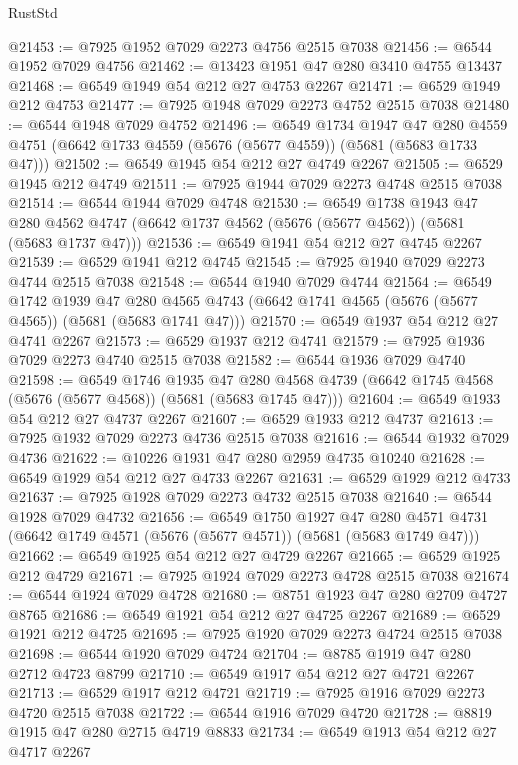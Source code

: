 \begin{lexlean}{RustStd}
\begin{coremodule}
@21453 := @7925 @1952 @7029 @2273 @4756 @2515 @7038
@21456 := @6544 @1952 @7029 @4756
@21462 := @13423 @1951 @47 @280 @3410 @4755 @13437
@21468 := @6549 @1949 @54 @212 @27 @4753 @2267
@21471 := @6529 @1949 @212 @4753
@21477 := @7925 @1948 @7029 @2273 @4752 @2515 @7038
@21480 := @6544 @1948 @7029 @4752
@21496 := @6549
    @1734
    @1947
    @47
    @280
    @4559
    @4751
    (@6642 @1733 @4559 (@5676 (@5677 @4559)) (@5681 (@5683 @1733 @47)))
@21502 := @6549 @1945 @54 @212 @27 @4749 @2267
@21505 := @6529 @1945 @212 @4749
@21511 := @7925 @1944 @7029 @2273 @4748 @2515 @7038
@21514 := @6544 @1944 @7029 @4748
@21530 := @6549
    @1738
    @1943
    @47
    @280
    @4562
    @4747
    (@6642 @1737 @4562 (@5676 (@5677 @4562)) (@5681 (@5683 @1737 @47)))
@21536 := @6549 @1941 @54 @212 @27 @4745 @2267
@21539 := @6529 @1941 @212 @4745
@21545 := @7925 @1940 @7029 @2273 @4744 @2515 @7038
@21548 := @6544 @1940 @7029 @4744
@21564 := @6549
    @1742
    @1939
    @47
    @280
    @4565
    @4743
    (@6642 @1741 @4565 (@5676 (@5677 @4565)) (@5681 (@5683 @1741 @47)))
@21570 := @6549 @1937 @54 @212 @27 @4741 @2267
@21573 := @6529 @1937 @212 @4741
@21579 := @7925 @1936 @7029 @2273 @4740 @2515 @7038
@21582 := @6544 @1936 @7029 @4740
@21598 := @6549
    @1746
    @1935
    @47
    @280
    @4568
    @4739
    (@6642 @1745 @4568 (@5676 (@5677 @4568)) (@5681 (@5683 @1745 @47)))
@21604 := @6549 @1933 @54 @212 @27 @4737 @2267
@21607 := @6529 @1933 @212 @4737
@21613 := @7925 @1932 @7029 @2273 @4736 @2515 @7038
@21616 := @6544 @1932 @7029 @4736
@21622 := @10226 @1931 @47 @280 @2959 @4735 @10240
@21628 := @6549 @1929 @54 @212 @27 @4733 @2267
@21631 := @6529 @1929 @212 @4733
@21637 := @7925 @1928 @7029 @2273 @4732 @2515 @7038
@21640 := @6544 @1928 @7029 @4732
@21656 := @6549
    @1750
    @1927
    @47
    @280
    @4571
    @4731
    (@6642 @1749 @4571 (@5676 (@5677 @4571)) (@5681 (@5683 @1749 @47)))
@21662 := @6549 @1925 @54 @212 @27 @4729 @2267
@21665 := @6529 @1925 @212 @4729
@21671 := @7925 @1924 @7029 @2273 @4728 @2515 @7038
@21674 := @6544 @1924 @7029 @4728
@21680 := @8751 @1923 @47 @280 @2709 @4727 @8765
@21686 := @6549 @1921 @54 @212 @27 @4725 @2267
@21689 := @6529 @1921 @212 @4725
@21695 := @7925 @1920 @7029 @2273 @4724 @2515 @7038
@21698 := @6544 @1920 @7029 @4724
@21704 := @8785 @1919 @47 @280 @2712 @4723 @8799
@21710 := @6549 @1917 @54 @212 @27 @4721 @2267
@21713 := @6529 @1917 @212 @4721
@21719 := @7925 @1916 @7029 @2273 @4720 @2515 @7038
@21722 := @6544 @1916 @7029 @4720
@21728 := @8819 @1915 @47 @280 @2715 @4719 @8833
@21734 := @6549 @1913 @54 @212 @27 @4717 @2267

\end{coremodule}
\end{lexlean}
